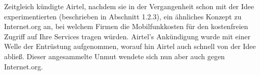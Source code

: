 \documentclass{article}
\begin{document}
\medskip

Zeitgleich kündigte Airtel, nachdem sie in der Vergangenheit schon mit der Idee experimentierten (beschrieben in Abschnitt 1.2.3), ein ähnliches Konzept zu Internet.org an, bei welchem Firmen die Mobilfunkkosten für den kostenfreien Zugriff auf Ihre Services tragen würden.
Airtel's Ankündigung wurde mit einer Welle der Entrüstung aufgenommen, worauf hin Airtel auch schnell von der Idee abließ.
Dieser angesammelte Unmut wendete sich nun aber auch gegen Internet.org.

\end{document}
